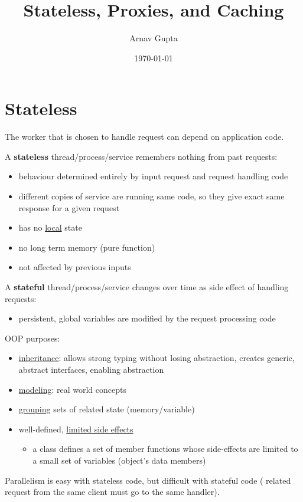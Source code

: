 \documentclass[11pt]{article}
\author{Arnav Gupta}
\date{\today}
\title{Stateless, Proxies, and Caching}
\begin{document}
\maketitle
\tableofcontents

\section{Stateless}
\label{sec:orge27eae5}
The worker that is chosen to handle request can depend on application code.

A \textbf{stateless} thread/process/service remembers nothing from past requests:
\begin{itemize}
\item behaviour determined entirely by input request and request handling code
\item different copies of service are running same code, so they give exact same
response for a given request
\item has no \uline{local} state
\item no long term memory (pure function)
\item not affected by previous inputs
\end{itemize}

A \textbf{stateful} thread/process/service changes over time as side effect of
handling requests:
\begin{itemize}
\item persistent, global variables are modified by the request processing code
\end{itemize}

OOP purposes:
\begin{itemize}
\item \uline{inheritance}: allows strong typing without losing abstraction, creates
generic, abstract interfaces, enabling abstraction
\item \uline{modeling}: real world concepts
\item \uline{grouping} sets of related state (memory/variable)
\item well-defined, \uline{limited side effects}
\begin{itemize}
\item a class defines a set of member functions whose side-effects are limited
to a small set of variables (object's data members)
\end{itemize}
\end{itemize}

Parallelism is easy with stateless code, but difficult with stateful code (
related request from the same client must go to the same handler).
\end{document}

